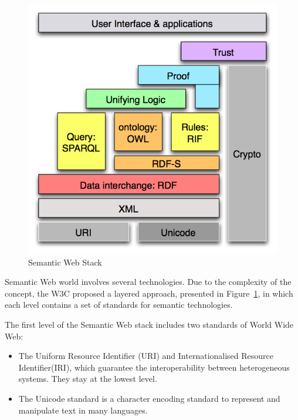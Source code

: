 \begin{figure}[tbh]
  \centering
	\includegraphics[width=0.75\linewidth]{images/semantic_web_stack}
	\caption{Semantic Web Stack} 
  	\label{fig:semantic-web-stack}
\end{figure}
 

Semantic Web world involves several technologies. Due to the complexity of the concept, the W3C proposed a layered approach, presented in Figure~\ref{fig:semantic-web-stack}, in which each level contains a set of standards for semantic technologies.
\pagebreak

The first level of the Semantic Web stack includes two standards of World Wide Web:
\begin{itemize}
\item  The Uniform Resource Identifier (URI)  and Internationalised Resource Identifier(IRI), which guarantee the interoperability between heterogeneous systems. They stay at the lowest level.
\item  The Unicode standard is a character encoding standard to represent and manipulate text in many languages.
\end{itemize}

